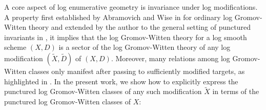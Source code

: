 \documentclass[12pt, oneside]{amsart}   	%
\newcommand{\ZZ}{\mathbb{Z}}
\numberwithin{equation}{section}
\numberwithin{thm}{section}
\numberwithin{figure}{section}
\begin{document}
A core aspect of log enumerative geometry is invariance under log modifications. A property first established by Abramovich and Wise in \cite{bir_GW} for ordinary log Gromov-Witten theory and extended by the author to the general setting of punctured invariants in \cite{pbirinv}, it implies that the log Gromov-Witten theory for a log smooth scheme $(X,D)$ is a sector of the log Gromov-Witten theory of any log modification $(\widetilde{X},\widetilde{D})$ of $(X,D)$. Moreover, many relations among log Gromov-Witten classes only manifest after passing to sufficiently modified targets, as highlighted in \cite{logroot,BNR2,logWDVV,degen}. In the present work, we show how to explicitly express the punctured log Gromov-Witten classes of any such modification $\widetilde{X}$ in terms of the punctured log Gromov-Witten classes of $X$:

%
%
%
%
%
\end{document}
